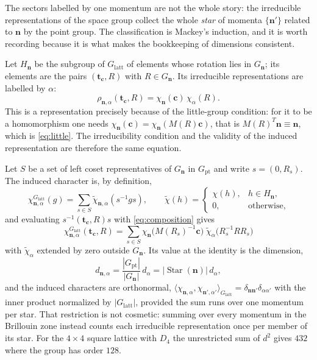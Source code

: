 \documentclass[12pt]{article}
\newcommand{\Glatt}{G_{\mathrm{latt}}}
\newcommand{\Gpt}{G_{\mathrm{pt}}}
\newcommand{\Gk}{G_{\mathbf{n}}}
\newcommand{\Star}{\operatorname{Star}}
\begin{document}
The sectors labelled by one momentum are not the whole story: the irreducible
representations of the space group collect the whole \emph{star} of momenta
$\{\mathbf{n}'\}$ related to $\mathbf{n}$ by the point group. The classification
is Mackey's induction\cite{serre1977,bc1972}, and it is worth recording because it
is what makes the bookkeeping of dimensions consistent.

Let $H_{\mathbf{n}}$ be the subgroup of $\Glatt$ of elements whose rotation lies in
$\Gk$; its elements are the pairs $(\mathbf{t}_{\mathbf{c}}, R)$ with
$R\in\Gk$. Its irreducible representations are labelled by $\alpha$:
\begin{equation}
  \rho_{\mathbf{n},\alpha}(\mathbf{t}_{\mathbf{c}}, R) =
  \chi_{\mathbf{n}}(\mathbf{c})\,\chi_{\alpha}(R).
  \label{eq:rho}
\end{equation}
This is a representation precisely because of the little-group condition: for it
to be a homomorphism one needs
$\chi_{\mathbf{n}}(\mathbf{c}) = \chi_{\mathbf{n}}(M(R)\mathbf{c})$, that is
$M(R)^{T}\mathbf{n}\equiv\mathbf{n}$, which is \eqref{eq:little}. The
irreducibility condition and the validity of the induced representation are
therefore the same equation.

Let $S$ be a set of left coset representatives of $\Gk$ in $\Gpt$ and write
$s = (0,R_s)$. The induced character is, by definition,
\begin{equation}
  \chi^{\Glatt}_{\mathbf{n},\alpha}(g) = \sum_{s\in S}
  \widetilde{\chi}_{\mathbf{n},\alpha}(s^{-1}gs),
  \qquad
  \widetilde{\chi}(h) =
  \begin{cases}
    \chi(h), & h \in H_{\mathbf{n}},\\
    0, & \text{otherwise},
  \end{cases}
\end{equation}
and evaluating $s^{-1}(\mathbf{t}_{\mathbf{c}},R)s$ with \eqref{eq:composition}
gives
\begin{equation}
  \boxed{\;
  \chi^{\Glatt}_{\mathbf{n},\alpha}(\mathbf{t}_{\mathbf{c}}, R)
  = \sum_{s\in S}
  \chi_{\mathbf{n}}\bigl(M(R_s)^{-1}\mathbf{c}\bigr)\;
  \widetilde{\chi}_{\alpha}\bigl(R_s^{-1} R R_s\bigr)
  \;}
  \label{eq:indchar}
\end{equation}
with $\widetilde{\chi}_\alpha$ extended by zero outside $\Gk$. Its value at the
identity is the dimension,
\begin{equation}
  d_{\mathbf{n},\alpha} = \frac{|\Gpt|}{|\Gk|}\,d_{\alpha} = |\Star(\mathbf{n})|\,d_{\alpha},
  \label{eq:dim}
\end{equation}
and the induced characters are orthonormal,
$\langle\chi_{\mathbf{n},\alpha},\chi_{\mathbf{n}',\alpha'}\rangle_{\Glatt} =
\delta_{\mathbf{n}\mathbf{n}'}\delta_{\alpha\alpha'}$ with the inner product normalized by $|\Glatt|$, provided the sum
runs over one momentum per star. That restriction is not cosmetic: summing over
every momentum in the Brillouin zone instead counts each irreducible
representation once per member of its star. For the $4\times4$ square lattice
with $D_4$ the unrestricted sum of $d^2$ gives $432$ where the group has order
$128$.
\end{document}
